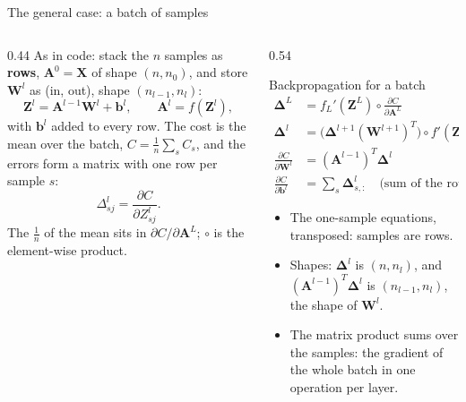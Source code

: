 \documentclass[10pt,aspectratio=169]{beamer}
\begin{document}
\begin{frame}{The general case: a batch of samples}
\begin{columns}[T]
\begin{column}{0.44\textwidth}
\small
As in code: stack the $n$ samples as \textbf{rows}, $\bm{A}^{0}=\bm{X}$ of
shape $(n,n_{0})$, and store $\bm{W}^{l}$ as (in, out), shape
$(n_{l-1},n_{l})$:
\[
  \bm{Z}^{l}=\bm{A}^{l-1}\bm{W}^{l}+\bm{b}^{l},\qquad
  \bm{A}^{l}=f(\bm{Z}^{l}),
\]
with $\bm{b}^{l}$ added to every row.  The cost is the mean over the batch,
$C=\frac1n\sum_{s}C_{s}$, and the errors form a matrix with one row per
sample $s$:
\[
  \Delta^{l}_{sj}=\frac{\partial C}{\partial Z^{l}_{sj}}.
\]
\footnotesize The $\frac1n$ of the mean sits in
$\partial C/\partial\bm{A}^{L}$; $\circ$ is the element-wise product.
\end{column}
\begin{column}{0.54\textwidth}
\begin{block}{Backpropagation for a batch}
\vspace{-6pt}
\begin{align*}
  \bm{\Delta}^{L}&=f_{L}'(\bm{Z}^{L})\circ\frac{\partial C}{\partial\bm{A}^{L}}\\
  \bm{\Delta}^{l}&=\bigl(\bm{\Delta}^{l+1}(\bm{W}^{l+1})^{T}\bigr)\circ f'(\bm{Z}^{l})\\
  \frac{\partial C}{\partial\bm{W}^{l}}&=(\bm{A}^{l-1})^{T}\bm{\Delta}^{l}\\
  \frac{\partial C}{\partial\bm{b}^{l}}&=\textstyle\sum_{s}\bm{\Delta}^{l}_{s,:}
     \quad\text{(sum of the rows)}
\end{align*}
\end{block}
\footnotesize
\begin{itemize}
  \item The one-sample equations, transposed: samples are rows.
  \item Shapes: $\bm{\Delta}^{l}$ is $(n,n_{l})$, and
        $(\bm{A}^{l-1})^{T}\bm{\Delta}^{l}$ is $(n_{l-1},n_{l})$, the shape
        of $\bm{W}^{l}$.
  \item The matrix product sums over the samples: the gradient of the
        whole batch in one operation per layer.
\end{itemize}
\end{column}
\end{columns}
\end{frame}
\end{document}
